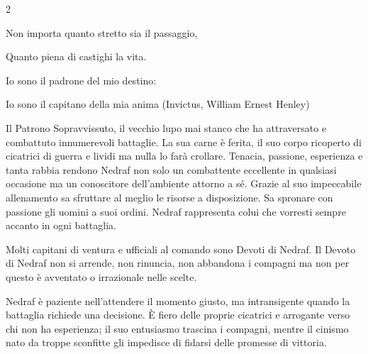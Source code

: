 \begin{multicols}{2}
\begin{enfasi}
{\medskip

Non importa quanto stretto sia il passaggio,

Quanto piena di castighi la vita.

Io sono il padrone del mio destino:

Io sono il capitano della mia anima (Invictus, William Ernest Henley)
}\end{enfasi}

Il Patrono Sopravvissuto, il vecchio lupo mai stanco che ha attraversato e combattuto innumerevoli battaglie. La sua carne è ferita, il suo corpo ricoperto di cicatrici di guerra e lividi ma nulla lo farà crollare. Tenacia, passione, esperienza e tanta rabbia rendono Nedraf non solo un combattente eccellente in qualsiasi occasione ma un conoscitore dell'ambiente attorno a sé. Grazie al suo impeccabile allenamento sa sfruttare al meglio le risorse a disposizione. Sa spronare con passione gli uomini a suoi ordini.
Nedraf rappresenta colui che vorresti sempre accanto in ogni battaglia.

Molti capitani di ventura e ufficiali al comando sono Devoti di Nedraf. Il Devoto di Nedraf non si arrende, non rinuncia, non abbandona i compagni ma non per questo è avventato o irrazionale nelle scelte.

Nedraf è paziente nell'attendere il momento giusto, ma intransigente quando la battaglia richiede una decisione. È fiero delle proprie cicatrici e arrogante verso chi non ha esperienza; il suo entusiasmo trascina i compagni, mentre il cinismo nato da troppe sconfitte gli impedisce di fidarsi delle promesse di vittoria.


\end{multicols}
